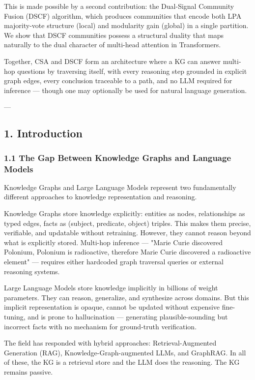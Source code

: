 \documentclass[10pt,journal,compsoc]{IEEEtran}
\begin{document}
This is made possible by a second contr\-ibution: the \textit{}Dual-Signal Community
Fusion (DSCF)\textit{} algorithm, which produces communities that encode both LPA
majority-vote structure (local) and modularity gain (global) in a single
partition. We show that DSCF communities possess a structural duality that
maps naturally to the dual character of multi-head attention in Transf\-ormers.

Together, CSA and DSCF form an archi\-tecture where a KG can answer multi-hop
questions by traversing itself, with every reasoning step grounded in explicit
graph edges, every conclusion traceable to a path, and no LLM required for
inference — though one may optionally be used for natural language generation.

---

\subsection{1. Introd\-uction}

\subsubsection{1.1 The Gap Between Knowledge Graphs and Language Models}

Knowledge Graphs and Large Language Models represent two funda\-mentally
different approaches to knowledge repre\-sentation and reasoning.

Knowledge Graphs store knowledge explicitly: entities as nodes, relat\-ionships
as typed edges, facts as (subject, predicate, object) triples. This makes
them precise, verifiable, and updatable without retraining. However, they
cannot reason beyond what is explicitly stored. Multi-hop inference — "Marie
Curie discovered Polonium, Polonium is radioactive, therefore Marie Curie
discovered a radioactive element" — requires either hardcoded graph traversal
queries or external reasoning systems.

Large Language Models store knowledge implicitly in billions of weight
parameters. They can reason, generalize, and synthesize across domains. But
this implicit repre\-sentation is opaque, cannot be updated without expensive
fine-tuning, and is prone to hallu\-cination — generating plausible-sounding
but incorrect facts with no mechanism for ground-truth verif\-ication.

The field has responded with hybrid approaches: Retrieval-Augmented Generation
(RAG), Knowledge-Graph-augmented LLMs, and GraphRAG. In all of these, the KG
is a retrieval store and the LLM does the reasoning. The KG remains passive.
\end{document}
